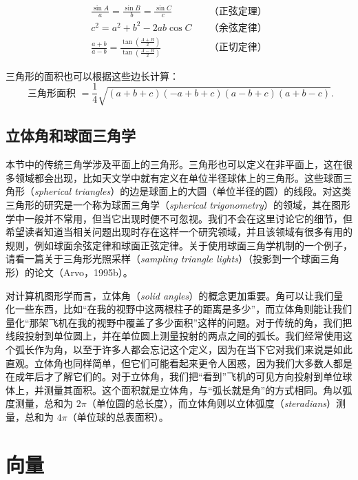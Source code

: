 \[
  \begin{aligned}
    \frac{\sin A}{a}=\frac{\sin B}{b}=\frac{\sin C}{c}\quad                                      & \text{（正弦定理）} \\
    c^{2}=a^{2}+b^{2}-2 a b \cos C\quad                                                          & \text{（余弦定律）} \\
    \frac{a+b}{a-b}=\frac{\tan \left(\frac{A+B}{2}\right)}{\tan \left(\frac{A-B}{2}\right)}\quad & \text{（正切定律）}
  \end{aligned}
\]

三角形的面积也可以根据这些边长计算：
\[
  \text { 三角形面积 }=\frac{1}{4} \sqrt{(a+b+c)(-a+b+c)(a-b+c)(a+b-c)} .
\]

\subsection{立体角和球面三角学}

本节中的传统三角学涉及平面上的三角形。三角形也可以定义在非平面上，这在很多领域都会出现，比如天文学中就有定义在单位半径球体上的三角形。这些球面三角形（\textit{spherical triangles}）的边是球面上的大圆（单位半径的圆）的线段。对这类三角形的研究是一个称为球面三角学（\textit{spherical trigonometry}）的领域，其在图形学中一般并不常用，但当它出现时便不可忽视。我们不会在这里讨论它的细节，但希望读者知道当相关问题出现时存在这样一个研究领域，并且该领域有很多有用的规则，例如球面余弦定律和球面正弦定律。关于使用球面三角学机制的一个例子，请看一篇关于三角形光照采样（\textit{sampling triangle lights}）（投影到一个球面三角形）的论文（Arvo，1995b）。

对计算机图形学而言，立体角（\textit{solid angles}）的概念更加重要。角可以让我们量化一些东西，比如“在我的视野中这两根柱子的距离是多少”，而立体角则能让我们量化“那架飞机在我的视野中覆盖了多少面积”这样的问题。对于传统的角，我们把线段投射到单位圆上，并在单位圆上测量投射的两点之间的弧长。我们经常使用这个弧长作为角，以至于许多人都会忘记这个定义，因为在当下它对我们来说是如此直观。立体角也同样简单，但它们可能看起来更令人困惑，因为我们大多数人都是在成年后才了解它们的。对于立体角，我们把“看到”飞机的可见方向投射到单位球体上，并测量其面积。这个面积就是立体角，与“弧长就是角”的方式相同。角以弧度测量，总和为 $2\pi$（单位圆的总长度），而立体角则以立体弧度（\textit{steradians}）测量，总和为 $4\pi$（单位球的总表面积）。

\section{向量}

